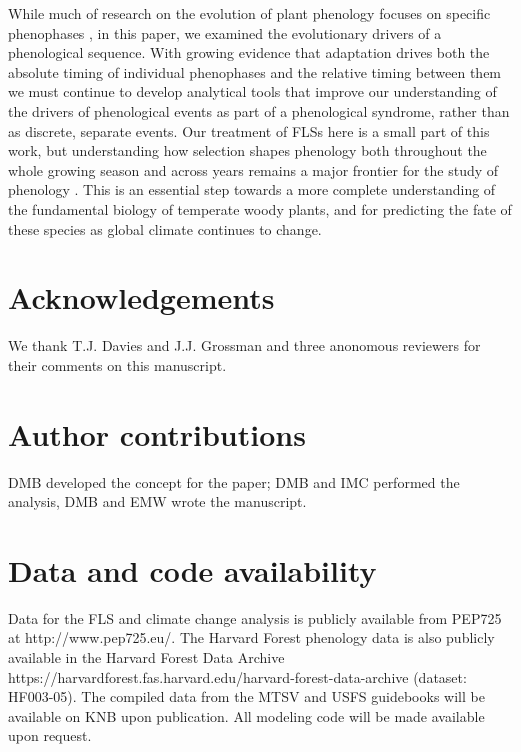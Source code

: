 \documentclass[11pt]{article}
\begin{document}
\noindent While much of research on the evolution of plant phenology focuses on specific phenophases  \citep[e.g.][]{Savage2013,OLLERTON_1992}, in this paper, we examined the evolutionary drivers of a phenological sequence. With growing evidence that adaptation drives both the absolute timing of individual phenophases and the relative timing between them we must continue to develop analytical tools that improve our understanding of the drivers of phenological events as part of a phenological syndrome, rather than as discrete, separate events. 
Our treatment of FLSs here is a small part of this work, but understanding how selection shapes phenology both throughout the whole growing season and across years remains a major frontier for the study of phenology \citep{Wolkovich2014b}. This is an essential step towards a more complete understanding of the fundamental biology of temperate woody plants, and for predicting the fate of these species as global climate continues to change.


\section*{Acknowledgements}
\noindent We thank T.J. Davies and J.J. Grossman and three anonomous reviewers for their comments on this manuscript.

\section*{Author contributions}
DMB developed the concept for the paper; DMB and IMC performed the analysis, DMB and EMW wrote the manuscript.

\section*{Data and code availability}
Data for the FLS and climate change analysis is publicly available from PEP725 at http://www.pep725.eu/. The Harvard Forest phenology data is also publicly available in the Harvard Forest Data Archive https://harvardforest.fas.harvard.edu/harvard-forest-data-archive (dataset: HF003-05). The compiled data from the MTSV and USFS guidebooks will be available on KNB upon publication. All modeling code will be made available upon request. %
\end{document}
